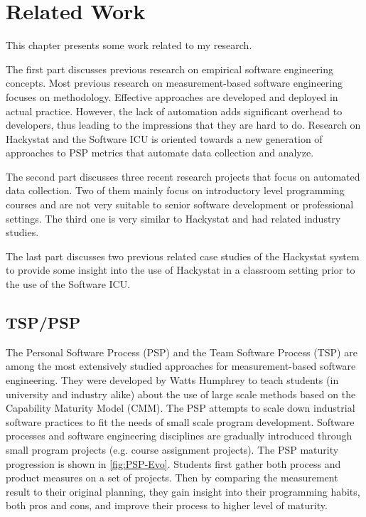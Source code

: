 \chapter{Related Work}
This chapter presents some work related to my research.

The first part discusses previous research on empirical software engineering concepts. Most previous research on measurement-based software engineering focuses on methodology. Effective approaches are developed and deployed in actual practice. However, the lack of automation adds significant overhead to developers, thus leading to the impressions that they are hard to do. Research on Hackystat and the Software ICU is oriented towards a new generation of approaches to PSP metrics that automate data collection and analyze\cite{csdl2-02-07}.

The second part discusses three recent research projects that focus on automated data collection. Two of them mainly focus on introductory level programming courses and are not very suitable to senior software development or professional settings. The third one is very similar to Hackystat and had related industry studies.


The last part discusses two previous related case studies of the Hackystat system to provide some insight into the use of Hackystat in a classroom setting prior to the use of the Software ICU.

\section {TSP/PSP}
The Personal Software Process (PSP)\cite{book:psp} and the Team Software Process (TSP)\cite{book:tsp} are among the most extensively studied approaches for measurement-based software engineering. They were developed by Watts Humphrey to teach students (in university and industry alike) about the use of large scale methods based on the Capability Maturity Model (CMM)\cite{cmm}. The PSP attempts to scale down industrial software practices to fit the needs of small scale program development. Software processes and software engineering disciplines are gradually introduced through small program projects (e.g. course assignment projects). The PSP maturity progression is shown in \autoref{fig:PSP-Evo}. Students first gather both process and product measures on a set of projects. Then by comparing the measurement result to their original planning, they gain insight into their programming habits, both pros and cons, and improve their process to higher level of maturity.

